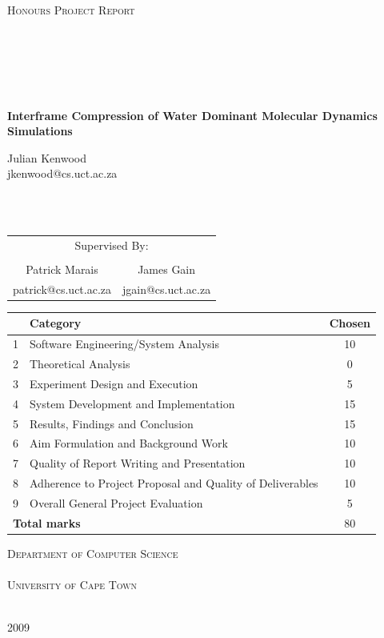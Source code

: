 \documentclass[a4paper,11pt]{report}
\begin{document}
\pagestyle{empty}

\begin{titlepage}
\begin{center}

\textsc{\Large Honours Project Report \\
\ \\
\ \\
\ \\
\ \\
\ \\
}

{\huge \bfseries
Interframe Compression of Water Dominant Molecular Dynamics Simulations 
\\}

\vfill

\large Julian Kenwood
\\
\small{jkenwood@cs.uct.ac.za}

\ \\
\ \\

\begin{tabular}{cc}
  \multicolumn{2}{c}{\large Supervised By:} \\
  \\ 
  \large Patrick Marais & \large James Gain
  \\
  \small patrick@cs.uct.ac.za & \small jgain@cs.uct.ac.za
\end{tabular}

\vfill

\begin{tabular}{|l|l|c|}
  \hline
  & \textbf{Category} & \textbf{Chosen} \\
  \hline
  1 & Software Engineering/System Analysis & 10 \\
  \hline
  2 & Theoretical Analysis & 0 \\
  \hline
  3 & Experiment Design and Execution & 5 \\
  \hline
  4 & System Development and Implementation & 15 \\
  \hline
  5 & Results, Findings and Conclusion & 15 \\
  \hline
  6 & Aim Formulation and Background Work & 10 \\
  \hline
  7 & Quality of Report Writing and Presentation & 10 \\
  \hline
  8 & Adherence to Project Proposal and Quality of Deliverables & 10 \\
  \hline
  9 & Overall General Project Evaluation & 5 \\
  \hline
  \multicolumn{2}{|l|}{\textbf{Total marks}} & 80 \\
  \hline
\end{tabular}

\vfill

\textsc{\Large Department of Computer Science \\
\ \\
University of Cape Town \\
\ \\}

{\large 2009}

\end{center}
\end{titlepage}
\end{document}
